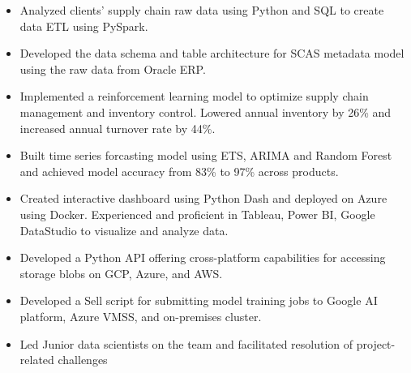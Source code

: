 \documentclass[11pt,a4paper,roman]{moderncv}
\begin{document}
{{\begin{itemize}
\item Analyzed clients' supply chain raw data using Python and SQL to create data ETL using PySpark.
\item Developed the data schema and table architecture for SCAS metadata model using the raw data from Oracle ERP.
\item Implemented a reinforcement learning model to optimize supply chain management and inventory control. Lowered annual inventory by 26\% and increased annual turnover rate by 44\%.
\item Built time series forcasting model using ETS, ARIMA and Random Forest and achieved model accuracy from 83\% to 97\% across products.
\item Created interactive dashboard using Python Dash and deployed on Azure using Docker. Experienced and proficient in Tableau, Power BI, Google DataStudio to visualize and analyze data.
\item Developed a Python API offering cross-platform capabilities for accessing storage blobs on GCP, Azure, and AWS.
\item Developed a Sell script for submitting model training jobs to Google AI platform, Azure VMSS, and on-premises cluster.
\item Led Junior data scientists on the team and facilitated resolution of project-related challenges
\end{itemize}
}

}
\end{document}
